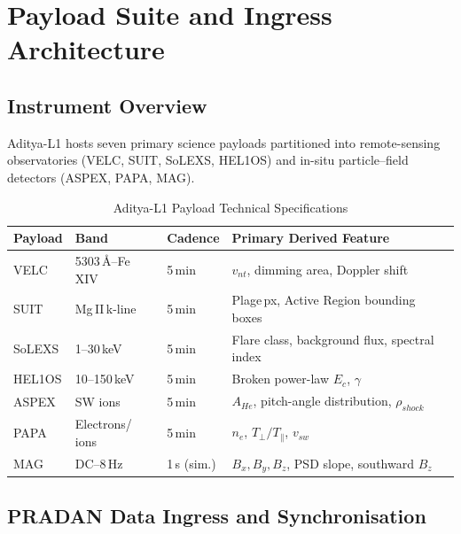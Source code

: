 \documentclass[conference,10pt,twocolumn]{IEEEtran}
\begin{document}
\section{Payload Suite and Ingress Architecture}

\subsection{Instrument Overview}
Aditya-L1 hosts seven primary science payloads partitioned into remote-sensing observatories (VELC, SUIT, SoLEXS, HEL1OS) and in-situ particle--field detectors (ASPEX, PAPA, MAG).

\begin{table}[htbp]
\caption{Aditya-L1 Payload Technical Specifications}
\begin{center}
\renewcommand{\arraystretch}{1.3}
\begin{tabular}{@{}p{1.1cm} p{1.4cm} p{1.5cm} p{3.0cm}@{}}
\toprule
\textbf{Payload} & \textbf{Band} & \textbf{Cadence} & \textbf{Primary Derived Feature} \\
\midrule
VELC  & 5303\,\AA--Fe\,XIV & 5\,min & $v_{nt}$, dimming area, Doppler shift \\
SUIT  & Mg\,II\,k-line & 5\,min & Plage\,px, Active Region bounding boxes \\
SoLEXS & 1--30\,keV & 5\,min & Flare class, background flux, spectral index \\
HEL1OS & 10--150\,keV & 5\,min & Broken power-law $E_c$, $\gamma$ \\
ASPEX & SW ions & 5\,min & $A_{He}$, pitch-angle distribution, $\rho_{shock}$ \\
PAPA & Electrons/ ions & 5\,min & $n_e$, $T_\perp/T_\parallel$, $v_{sw}$ \\
MAG & DC--8\,Hz & 1\,s (sim.) & $B_x,B_y,B_z$, PSD slope, southward $B_z$ \\
\bottomrule
\end{tabular}
\label{tab:payloads}
\end{center}
\end{table}

\subsection{PRADAN Data Ingress and Synchronisation}
\end{document}

